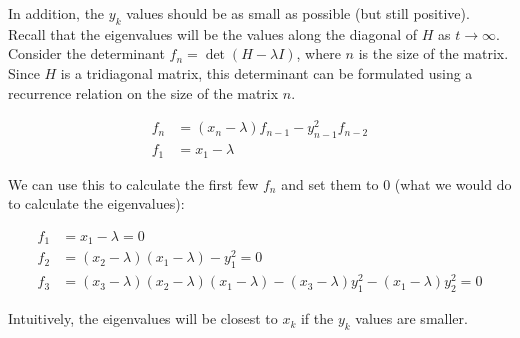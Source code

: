 In addition, the $y_k$ values should be as small as possible (but still positive). Recall that the eigenvalues will be the values along the diagonal of $H$ as $t\rightarrow \infty$. Consider the determinant $f_n = \det (H-\lambda I)$, where $n$ is the size of the matrix. Since $H$ is a tridiagonal matrix, this determinant can be formulated using a recurrence relation on the size of the matrix $n$.

\begin{align*}
f_n &= (x_n-\lambda)f_{n-1}-y_{n-1}^2f_{n-2} \\
f_1 &= x_1-\lambda
\end{align*}

We can use this to calculate the first few $f_n$ and set them to $0$ (what we would do to calculate the eigenvalues):

\begin{align*}
f_1 &= x_1-\lambda = 0\\
f_2 &= (x_2-\lambda)(x_1-\lambda)-y_1^2 = 0\\
f_3 &= (x_3-\lambda)(x_2-\lambda)(x_1-\lambda)-(x_3-\lambda)y_1^2-(x_1-\lambda)y^2_2 = 0
\end{align*}

Intuitively, the eigenvalues will be closest to $x_k$ if the $y_k$ values are smaller. 





%
